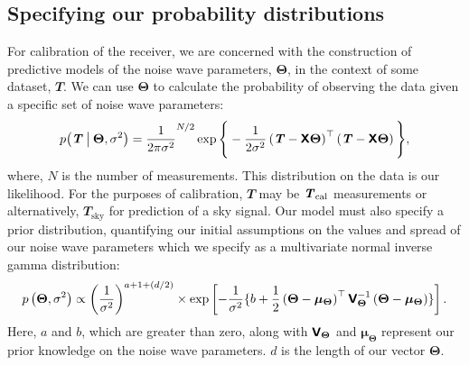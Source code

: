 \subsection{Specifying our probability distributions}
\label{sec:likelihood}
For calibration of the receiver, we are concerned with the construction of predictive models of the noise wave parameters, $\boldsymbol{\Theta}$, in the context of some dataset, $\mathbfit{T}$. We can use $\boldsymbol{\Theta}$ to calculate the probability of observing the data given a specific set of noise wave parameters:
\begin{equation}\label{likelihood}
    p\big(\mathbfit{T} \given[\big] \boldsymbol{\Theta}, \sigma^2\big) = \frac{1}{2\pi \sigma^2}^{N/2}\exp{ \Bigg\{ -\frac{1}{2\sigma^2}\left(\mathbfit{T}-\mathbfss{X}\boldsymbol{\Theta}\right)^{\top}\left(\mathbfit{T} -\mathbfss{X}\boldsymbol{\Theta}\right) \Bigg\}},
\end{equation}
where, $N$ is the number of measurements. This distribution on the data is our likelihood. For the purposes of calibration, $\mathbfit{T}$ may be $\y$ measurements or alternatively, $\mathbfit{T}_{\mathrm{sky}}$ for prediction of a sky signal. Our model must also specify a prior distribution, quantifying our initial assumptions on the values and spread of our noise wave parameters which we specify as a multivariate normal inverse gamma distribution:
\begin{equation}
  \label{eqn:prior}
  p\left(\boldsymbol{\Theta}, \sigma^2\right) \propto \left(\frac{1}{\sigma^2}\right)^{a+1+\left(d/2\right)} \times \exp \left[ -\frac{1}{\sigma^2}\{b+\frac{1}{2}\left(\boldsymbol{\Theta}-\boldsymbol{\mu}_{\boldsymbol{\Theta}}\right)^{\top}\mathbfss{V}_{\boldsymbol{\Theta}}^{-1}\left(\boldsymbol{\Theta}-\boldsymbol{\mu}_{\boldsymbol{\Theta}}\right)\} \right].
\end{equation}
Here, $a$ and $b$, which are greater than zero, along with $\mathbfss{V}_{\boldsymbol{\Theta}}$ and $\boldsymbol{\mu}_{\boldsymbol{\Theta}}$ represent our prior knowledge on the noise wave parameters. $d$ is the length of our vector $\boldsymbol{\Theta}$.

